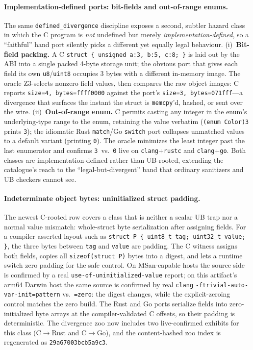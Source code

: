 \documentclass[10pt,a4paper]{article}
\begin{document}
\paragraph{Implementation-defined ports: bit-fields and out-of-range enums.}
The same \texttt{defined\_divergence} discipline exposes a second, subtler
hazard class in which the C program is \emph{not} undefined but merely
\emph{implementation-defined}, so a ``faithful'' hand port silently picks a
different yet equally legal behaviour. (i)~\textbf{Bit-field packing.} A C
\texttt{struct \{ unsigned a:3, b:5, c:8; \}} is laid out by the ABI into a
single packed 4-byte storage unit; the obvious port that gives each field its
own \texttt{u8}/\texttt{uint8} occupies 3 bytes with a different in-memory
image. The oracle Z3-selects nonzero field values, then compares the raw object
images: C reports \texttt{size=4, bytes=ffff0000} against the port's
\texttt{size=3, bytes=071fff}---a divergence that surfaces the instant the
struct is \texttt{memcpy}'d, hashed, or sent over the wire. (ii)~\textbf{Out-of-range
enum.} C permits casting any integer in the enum's underlying-type range to the
enum, retaining the value verbatim (\texttt{(enum Color)3} prints \texttt{3});
the idiomatic Rust \texttt{match}/Go \texttt{switch} port collapses unmatched
values to a default variant (printing \texttt{0}). The oracle minimizes the
least integer past the last enumerator and confirms \texttt{3}~vs.~\texttt{0}
live on \texttt{clang}+\texttt{rustc} and \texttt{clang}+\texttt{go}. Both
classes are implementation-defined rather than UB-rooted, extending the
catalogue's reach to the ``legal-but-divergent'' band that ordinary
sanitizers and UB checkers cannot see.

\paragraph{Indeterminate object bytes: uninitialized struct padding.}
The newest C-rooted row covers a class that is neither a scalar UB trap nor a
normal value mismatch: whole-struct byte serialization after assigning fields.
For a compiler-asserted layout such as
\texttt{struct P \{ uint8\_t tag; uint32\_t value; \}}, the three bytes between
\texttt{tag} and \texttt{value} are padding.  The C witness assigns both fields,
copies all \texttt{sizeof(struct P)} bytes into a digest, and lets a runtime
switch zero padding for the safe control.  On MSan-capable hosts the source side
is confirmed by a real \texttt{use-of-uninitialized-value} report; on this
artifact's arm64 Darwin host the same source is confirmed by real \texttt{clang}
\texttt{-ftrivial-auto-var-init=pattern} vs.\ \texttt{=zero}: the digest changes,
while the explicit-zeroing control matches the zero build.  The Rust and Go ports
serialize fields into zero-initialized byte arrays at the compiler-validated C
offsets, so their padding is deterministic.  The divergence zoo now includes two
live-confirmed exhibits for this class (C$\to$Rust and C$\to$Go), and the
content-hashed zoo index is regenerated as
\texttt{29a67003bcb5a9c3}.
\end{document}
